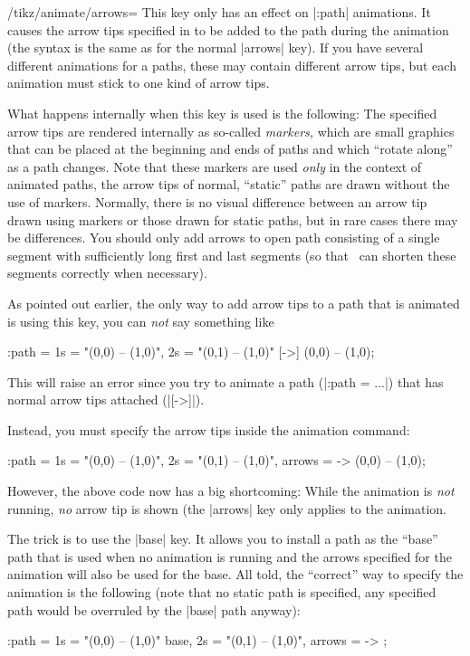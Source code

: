 \begin{key}{/tikz/animate/arrows=}
  This key only has an effect on |:path| animations. It causes the
  arrow tips specified in  to be added to the path
  during the animation (the syntax is the same as for the normal
  |arrows| key). If you have several different animations for a paths,
  these may contain different arrow tips, but each animation must
  stick to one kind of arrow tips.

  What happens internally when this key is used is the following: The
  specified arrow tips are rendered internally as so-called
  \emph{markers,} which are small graphics that can be placed at the
  beginning and ends of paths and which ``rotate along'' as a path
  changes. Note that these markers are used \emph{only} in the context
  of animated paths, the arrow tips of normal, ``static'' paths are
  drawn without the use of markers. Normally, there is no visual
  difference between an arrow tip drawn 
  using markers or those drawn for static paths, but in rare cases
  there may be differences. You should only add arrows to open
  path consisting of a single segment with sufficiently long first and
  last segments (so that \tikzname\ can shorten these segments
  correctly when necessary).

  As pointed out earlier, the only way to add arrow tips to a path
  that is animated is using this key, you can \emph{not} say something
  like
\begin{codeexample}
\draw :path = { 1s = "{(0,0) -- (1,0)}", 2s = "{(0,1) -- (1,0)}" }
  [->] (0,0) -- (1,0);  
\end{codeexample}    
  This will raise an error since you try to animate a path
  (|:path = ...|) that has normal arrow tips attached (|[->]|).

  Instead, you must specify the arrow tips inside the animation
  command: 
\begin{codeexample}
\draw :path = { 1s = "{(0,0) -- (1,0)}", 2s = "{(0,1) -- (1,0)}", arrows = -> }
  (0,0) -- (1,0);  
\end{codeexample}    

  However, the above code now has a big shortcoming: While the
  animation is \emph{not} running, \emph{no} arrow tip is shown (the
  |arrows| key only applies to the animation.

  The trick is to use the |base| key. It allows you to install a path
  as the ``base'' path that is used when no animation is running and
  the arrows specified for the animation will also be used for the
  base. All told, the ``correct'' way to specify the animation is the
  following (note that no static path is specified, any specified path
  would be overruled by the |base| path anyway): 
\begin{codeexample}
\draw :path = { 1s = "{(0,0) -- (1,0)}" base, 2s = "{(0,1) -- (1,0)}", arrows = -> };
\end{codeexample}    


\end{key}
